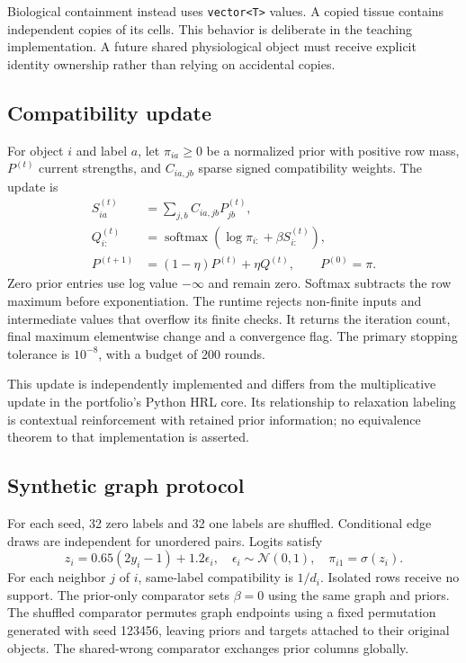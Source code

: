 \documentclass[10pt,a4paper]{article}
\begin{document}
Biological containment instead uses \texttt{vector<T>} values. A copied tissue contains independent copies of its cells. This behavior is deliberate in the teaching implementation. A future shared physiological object must receive explicit identity ownership rather than relying on accidental copies.

\subsection*{Compatibility update}
For object $i$ and label $a$, let $\pi_{ia}\geq0$ be a normalized prior with positive row mass, $P^{(t)}$ current strengths, and $C_{ia,jb}$ sparse signed compatibility weights. The update is
\begin{align}
S^{(t)}_{ia}&=\sum_{j,b}C_{ia,jb}P^{(t)}_{jb},\\
Q^{(t)}_{i:}&=\operatorname{softmax}\!\left(\log\pi_{i:}+\beta S^{(t)}_{i:}\right),\\
P^{(t+1)}&=(1-\eta)P^{(t)}+\eta Q^{(t)},\qquad P^{(0)}=\pi.
\end{align}
Zero prior entries use log value $-\infty$ and remain zero. Softmax subtracts the row maximum before exponentiation. The runtime rejects non-finite inputs and intermediate values that overflow its finite checks. It returns the iteration count, final maximum elementwise change and a convergence flag. The primary stopping tolerance is $10^{-8}$, with a budget of 200 rounds.

This update is independently implemented and differs from the multiplicative update in the portfolio's Python HRL core. Its relationship to relaxation labeling is contextual reinforcement with retained prior information\cite{hummel}; no equivalence theorem to that implementation is asserted.

\subsection*{Synthetic graph protocol}
For each seed, 32 zero labels and 32 one labels are shuffled. Conditional edge draws are independent for unordered pairs. Logits satisfy
\begin{equation}
z_i=0.65(2y_i-1)+1.2\epsilon_i,\quad \epsilon_i\sim\mathcal{N}(0,1),\quad \pi_{i1}=\sigma(z_i).
\end{equation}
For each neighbor $j$ of $i$, same-label compatibility is $1/d_i$. Isolated rows receive no support. The prior-only comparator sets $\beta=0$ using the same graph and priors. The shuffled comparator permutes graph endpoints using a fixed permutation generated with seed 123456, leaving priors and targets attached to their original objects. The shared-wrong comparator exchanges prior columns globally.
\end{document}
